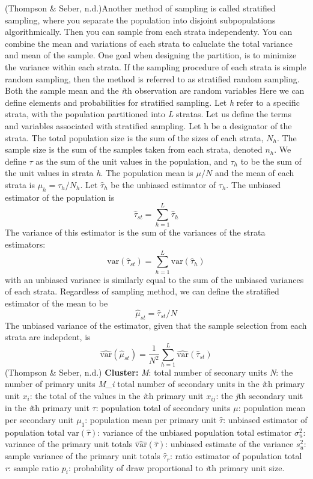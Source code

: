 \documentclass[12pt,twoside]{reedthesis}
\begin{document}
(Thompson \& Seber, n.d.)Another method of sampling is called stratified sampling, where you separate the population into disjoint subpopulations algorithmically. Then you can sample from each strata independenty. You can combine the mean and variations of each strata to caluclate the total variance and mean of the sample. One goal when designing the partition, is to minimize the variance within each strata. If the sampling procedure of each strata is simple random sampling, then the method is referred to as stratified random sampling. Both the sample mean and the \emph{i}th observation are random variables
Here we can define elements and probabilities for stratified sampling. Let \emph{h} refer to a specific strata, with the population partitioned into \emph{L} stratas. Let us define the terms and variables associated with stratified sampling.
Let h be a designator of the strata. The total population size is the sum of the sizes of each strata, \(N_h\). The sample size is the sum of the samples taken from each strata, denoted \(n_h\). We define \(\tau\) as the sum of the unit values in the population, and \(\tau_h\) to be the sum of the unit values in strata \emph{h}. The population mean is \(\mu/N\) and the mean of each strata is \(\mu_h = \tau_h/N_h\).
Let \(\hat{\tau}_h\) be the unbiased estimator of \(\tau_h\). The unbiased estimator of the population is
\[ \hat{\tau}_{st} = \sum^L_{h=1}\hat{\tau}_h \]
The variance of this estimator is the sum of the variances of the strata estimators:
\[
\text{var}\left(\hat{\tau}_{st}\right) = \sum^L_{h=1}\text{var}\left(\hat{\tau}_h\right)
\]
with an unbiased variance is similarly equal to the sum of the unbiased variances of each strata.
Regardless of sampling method, we can define the stratified estimator of the mean to be
\[
\hat{\mu}_{st} = \hat{\tau}_{st}/N
\]
The unbiased variance of the estimator, given that the sample selection from each strata are indepdent, is
\[
\widehat{\text{var}} \left( \hat{\mu}_{st} \right) = \frac{1}{N^2} \sum^L_{h=1} \hat{\text{var}} \left(\hat{\tau}_{st}\right)
\]
(Thompson \& Seber, n.d.)
\textbf{Cluster:}
\emph{M}: total number of seconary units
\emph{N}: the number of primary units
\emph{M\_i} total number of secondary units in the \emph{i}th primary unit
\(x_i\): the total of the values in the \emph{i}th primary unit
\(x_{ij}\): the \emph{j}th secondary unit in the \emph{i}th primary unit
\(\tau\): population total of secondary units
\(\mu\): population mean per secondary unit
\(\mu_1\): population mean per primary unit
\(\hat{\tau}\): unbiased estimator of population total
\(\text{var}(\hat{\tau})\): variance of the unbiased population total estimator
\(\sigma^2_u\): variance of the primary unit totals
\(\widehat{\text{var}}(\hat{\tau})\): unbiased estimate of the variance
\(s_u^2\): sample variance of the primary unit totals
\(\hat{\tau}_r\): ratio estimator of population total
\emph{r}: sample ratio
\(p_i\): probability of draw proportional to \emph{i}th primary unit size.
\end{document}
